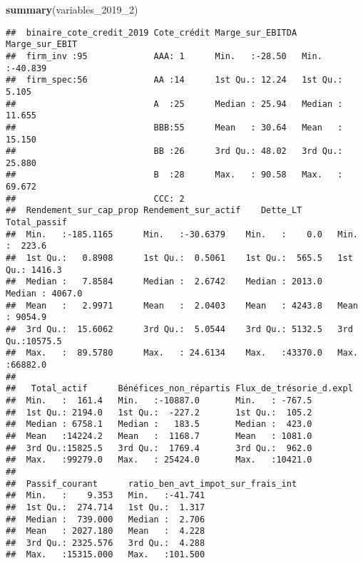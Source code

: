 \documentclass[
]{article}
\newenvironment{Shaded}{\begin{snugshade}}{\end{snugshade}}
\newcommand{\DecValTok}[1]{\textcolor[rgb]{0.00,0.00,0.81}{#1}}
\newcommand{\KeywordTok}[1]{\textcolor[rgb]{0.13,0.29,0.53}{\textbf{#1}}}
\newcommand{\NormalTok}[1]{#1}
\begin{document}
\begin{Shaded}
\begin{Highlighting}[]
\KeywordTok{summary}\NormalTok{(variables_}\DecValTok{2019}\NormalTok{_}\DecValTok{2}\NormalTok{)}
\end{Highlighting}
\end{Shaded}

\begin{verbatim}
##  binaire_cote_credit_2019 Cote_crédit Marge_sur_EBITDA Marge_sur_EBIT   
##  firm_inv :95             AAA: 1      Min.   :-28.50   Min.   :-40.839  
##  firm_spec:56             AA :14      1st Qu.: 12.24   1st Qu.:  5.105  
##                           A  :25      Median : 25.94   Median : 11.655  
##                           BBB:55      Mean   : 30.64   Mean   : 15.150  
##                           BB :26      3rd Qu.: 48.02   3rd Qu.: 25.880  
##                           B  :28      Max.   : 90.58   Max.   : 69.672  
##                           CCC: 2                                        
##  Rendement_sur_cap_prop Rendement_sur_actif    Dette_LT        Total_passif    
##  Min.   :-185.1165      Min.   :-30.6379    Min.   :    0.0   Min.   :  223.6  
##  1st Qu.:   0.8908      1st Qu.:  0.5061    1st Qu.:  565.5   1st Qu.: 1416.3  
##  Median :   7.8584      Median :  2.6742    Median : 2013.0   Median : 4067.0  
##  Mean   :   2.9971      Mean   :  2.0403    Mean   : 4243.8   Mean   : 9054.9  
##  3rd Qu.:  15.6062      3rd Qu.:  5.0544    3rd Qu.: 5132.5   3rd Qu.:10575.5  
##  Max.   :  89.5780      Max.   : 24.6134    Max.   :43370.0   Max.   :66882.0  
##                                                                                
##   Total_actif      Bénéfices_non_répartis Flux_de_trésorie_d.expl
##  Min.   :  161.4   Min.   :-10887.0       Min.   : -767.5        
##  1st Qu.: 2194.0   1st Qu.:  -227.2       1st Qu.:  105.2        
##  Median : 6758.1   Median :   183.5       Median :  423.0        
##  Mean   :14224.2   Mean   :  1168.7       Mean   : 1081.0        
##  3rd Qu.:15825.5   3rd Qu.:  1769.4       3rd Qu.:  962.0        
##  Max.   :99279.0   Max.   : 25424.0       Max.   :10421.0        
##                                                                  
##  Passif_courant      ratio_ben_avt_impot_sur_frais_int
##  Min.   :    9.353   Min.   :-41.741                  
##  1st Qu.:  274.714   1st Qu.:  1.317                  
##  Median :  739.000   Median :  2.706                  
##  Mean   : 2027.180   Mean   :  4.228                  
##  3rd Qu.: 2325.576   3rd Qu.:  4.288                  
##  Max.   :15315.000   Max.   :101.500                  

\end{verbatim}
\end{document}
